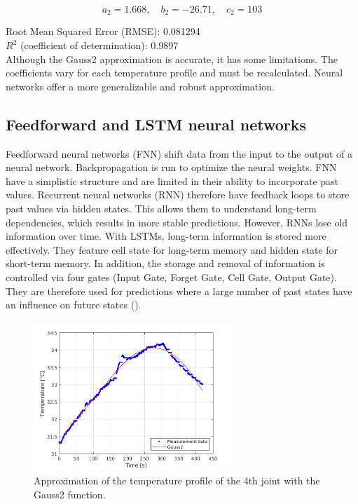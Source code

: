 \documentclass{ifacconf}
\begin{document}
\[
a_2 = 1.668, \quad b_2 = -26.71, \quad c_2 = 103
\]



Root Mean Squared Error (RMSE): 0.081294\\
$R^2$ (coefficient of determination): 0.9897\\

Although the Gauss2 approximation is accurate, it has some limitations. 
The coefficients vary for each temperature profile and must be recalculated. 
Neural networks offer a more generalizable and robust approximation.


\subsection{Feedforward and LSTM neural networks}
Feedforward neural networks (FNN) shift data from the input to the output of a neural network. Backpropagation is run to optimize the neural weights. FNN have a simplistic structure and are limited in their ability to incorporate past values. 
Recurrent neural networks (RNN) therefore have feedback loops to store past values via hidden states. This allows them to understand long-term dependencies, which results in more stable predictions.
However, RNNs lose old information over time. With LSTMs, long-term information is stored more effectively. They feature cell state for long-term memory and hidden state for short-term memory. In addition, the storage and removal of information is controlled via four gates (Input Gate, Forget Gate, Cell Gate, Output Gate).  
They are therefore used for predictions where a large number of past states have an influence on future states (\cite{Ljung}).

\begin{figure}[t]
	\begin{center}
		\includegraphics[width=7.5cm]{pictures/Gauss2_legend.png}    %
		\caption{Approximation of the temperature profile of the 4th joint with the Gauss2 function.} 
		\label{fig:Gauss2_legend}
	\end{center}
\end{figure}
\end{document}
